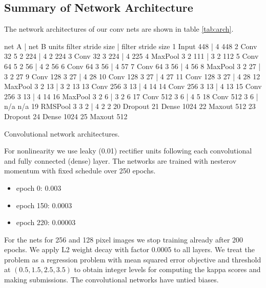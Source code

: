 \documentclass[12pt,a4paper]{scrartcl}
\begin{document}
\subsection{Summary of Network Architecture}
The network architectures of our conv nets are shown in table \ref{tab:arch}.
\begin{verbbox}
                            net A       |          net B
            units   filter stride size  |  filter stride size
 1 Input                           448  |     4           448
 2 Conv        32     5       2    224  |     4     2     224
 3 Conv        32     3            224  |     4           225 
 4 MaxPool            3       2    111  |     3     2     112 
 5 Conv        64     5       2     56  |     4     2      56
 6 Conv        64     3             56  |     4            57
 7 Conv        64     3             56  |     4            56
 8 MaxPool            3       2     27  |     3     2      27
 9 Conv       128     3             27  |     4            28
10 Conv       128     3             27  |     4            27
11 Conv       128     3             27  |     4            28
12 MaxPool            3       2     13  |     3     2      13
13 Conv       256     3             13  |     4            14
14 Conv       256     3             13  |     4            13
15 Conv       256     3             13  |     4            14
16 MaxPool            3       2      6  |     3     2       6
17 Conv       512     3              6  |     4             5
18 Conv       512     3              6  |   n/a           n/a
19 RMSPool            3       3      2  |     4     2       2
20 Dropout
21 Dense     1024
22 Maxout     512
23 Dropout
24 Dense     1024
25 Maxout     512
\end{verbbox}
\begin{table}[ht]
\centering
\theverbbox
\caption{Convolutional network architectures.}
\label{tab:arch}
\end{table}
%
For nonlinearity we use leaky (0.01) rectifier units following each convolutional and fully connected (dense) layer. The networks are trained with nesterov momentum with fixed schedule over 250 epochs.
  \begin{itemize}
  \item
    epoch 0: 0.003
  \item
    epoch 150: 0.0003
  \item
    epoch 220: 0.00003
  \end{itemize}
For the nets for 256 and 128 pixel images we stop training already after 200 epochs. We apply L2 weight decay with factor 0.0005 to all layers. We treat the problem as a regression problem with mean squared error objective and threshold at $(0.5, 1.5, 2.5, 3.5)$ to obtain integer levels for computing the kappa scores and making submissions. The convolutional networks have untied biases.
%
\end{document}
